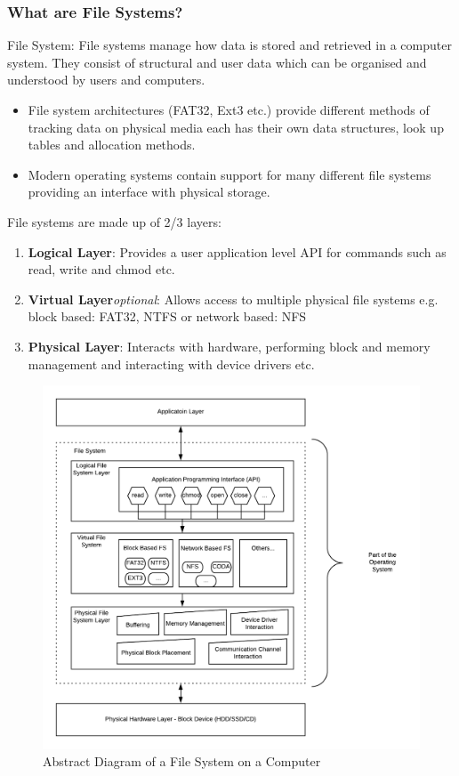 \documentclass{beamer}
\begin{document}
\begin{frame}[allowframebreaks]
	\frametitle{What are File Systems?}
	\begin{block}{File System:}
		File systems manage how data is stored and retrieved in a computer system. They consist of structural and user data which can be organised and understood by users and computers.
	\end{block}
	
	\begin{itemize}
		\item File system architectures (FAT32, Ext3 etc.) provide different methods of tracking data on physical media each has their own data structures, look up tables and allocation methods. \\
		
		\item Modern operating systems contain support for many different file systems providing an interface with physical storage. 
	\end{itemize}
	
	\newpage
	File systems are made up of 2/3 layers:
	\begin{enumerate}
		\item\textbf{Logical Layer}: Provides a user application level API for commands such as read, write and chmod etc.
		\item\textbf{Virtual Layer}\textit{optional}: Allows access to multiple physical file systems e.g. block based: FAT32, NTFS or network based: NFS
		\item\textbf{Physical Layer}: Interacts with hardware, performing block and memory management and interacting with device drivers etc.
	\end{enumerate}
	
	\begin{figure}[h]
		\includegraphics[scale=0.5]{abstract-fs-diagram}
		\caption{Abstract Diagram of a File System on a Computer}
		\label{fig:abstract-fs-diagram}	
	\end{figure}


\end{frame}
\end{document}
